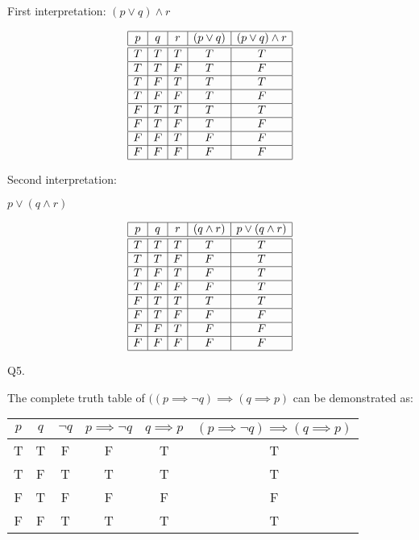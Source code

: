 \documentclass[12pt]{article}
\begin{document}
First interpretation:
 $(p \lor q) \land r$
  
  	\begin{displaymath}
  		\begin{array}[t]{|c|c|c|c|c|} \hline
    		p & q & r & (p \lor q) & (p \lor q) \land r \\ \hline\hline
    		T & T & T & T & T \\ \hline
    		T & T & F & T & F \\ \hline
    		T & F & T & T & T \\ \hline
  	 		T & F & F & T & F \\ \hline
  	 		F & T & T & T & T \\ \hline
    		F & T & F & T & F \\ \hline
    		F & F & T & F & F \\ \hline
  	 		F & F & F & F & F \\ \hline
  		\end{array}
  	\end{displaymath}
  	
  	Second interpretation:
  	
  	$p \lor (q \land r)$
  	
  	\begin{displaymath}
  		\begin{array}[t]{|c|c|c|c|c|} \hline
    		p & q & r & (q \land r) & p \lor (q \land r) \\ \hline\hline
    		T & T & T & T & T \\ \hline
    		T & T & F & F & T \\ \hline
    		T & F & T & F & T \\ \hline
  	 		T & F & F & F & T \\ \hline
  	 		F & T & T & T & T \\ \hline
    		F & T & F & F & F \\ \hline
    		F & F & T & F & F \\ \hline
  	 		F & F & F & F & F \\ \hline
  		\end{array}
  	\end{displaymath}

Q5.

The complete truth table of
$((p \implies \neg q) \implies (q \implies p)$ can be demonstrated as:

\begin{center}
	\begin{tabular}{|c c c | c | c | c|}
	\hline
	$p$ & $q$ & $\neg q$ & $p \implies \neg q$ & $q \implies p$ & $(p \implies \neg q) \implies (q \implies p)$ \\ \hline
	T & T & F &F &T &T \\ \hline
	T & F & T &T &T &T \\ \hline
	F & T & F &F &F &F \\ \hline
	F & F & T &T &T &T \\ \hline
	
	\end{tabular}
	\end{center}
	
\end{document}
